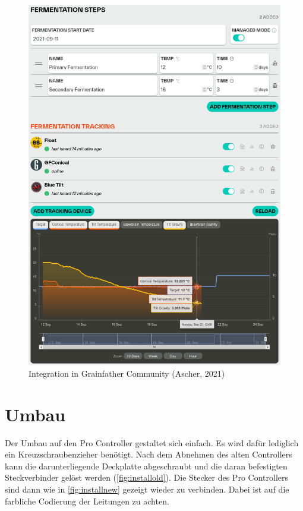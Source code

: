 \documentclass[a4paper,parskip=half]{scrartcl}
\begin{document}
\begin{figure}[H]
\centering
\includegraphics[width=14.4cm]{images/gfpc_integration.png}
\caption{Integration in Grainfather Community (Ascher, 2021)}
\label{fig:integration}
\end{figure}

\section*{Umbau}

Der Umbau auf den Pro Controller gestaltet sich einfach. Es
wird dafür lediglich ein Kreuzschraubenzieher benötigt.
Nach dem Abnehmen des alten Controllers kann die
darunterliegende Deckplatte abgeschraubt und die daran
befestigten Steckverbinder gelöst werden
(\autoref{fig:installold}). Die Stecker des
Pro Controllers sind dann wie in \autoref{fig:installnew}
gezeigt wieder zu verbinden. Dabei ist auf die farbliche
Codierung der Leitungen zu achten.
\end{document}
